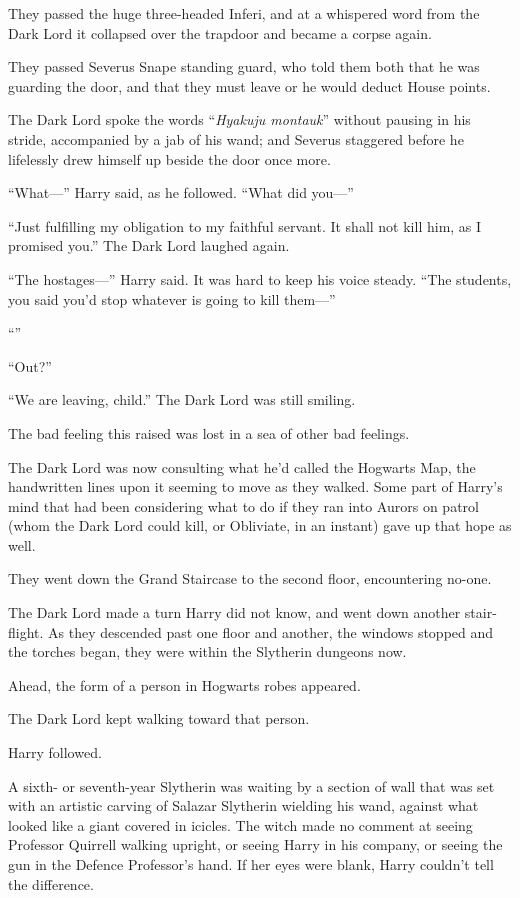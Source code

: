 They passed the huge three-headed Inferi, and at a whispered word from the Dark Lord it collapsed over the trapdoor and became a corpse again.

They passed Severus Snape standing guard, who told them both that he was guarding the door, and that they must leave or he would deduct House points.

The Dark Lord spoke the words “\emph{Hyakuju montauk}” without pausing in his stride, accompanied by a jab of his wand; and Severus staggered before he lifelessly drew himself up beside the door once more.

“What—” Harry said, as he followed. “What did you—”

“Just fulfilling my obligation to my faithful servant. It shall not kill him, as I promised you.” The Dark Lord laughed again.

“The hostages—” Harry said. It was hard to keep his voice steady. “The students, you said you’d stop whatever is going to kill them—”

“”

“Out?”

“We are leaving, child.” The Dark Lord was still smiling.

The bad feeling this raised was lost in a sea of other bad feelings.

The Dark Lord was now consulting what he’d called the Hogwarts Map, the handwritten lines upon it seeming to move as they walked. Some part of Harry’s mind that had been considering what to do if they ran into Aurors on patrol (whom the Dark Lord could kill, or Obliviate, in an instant) gave up that hope as well.

They went down the Grand Staircase to the second floor, encountering no-one.

The Dark Lord made a turn Harry did not know, and went down another stair-flight. As they descended past one floor and another, the windows stopped and the torches began, they were within the Slytherin dungeons now.

Ahead, the form of a person in Hogwarts robes appeared.

The Dark Lord kept walking toward that person.

Harry followed.

A sixth- or seventh-year Slytherin was waiting by a section of wall that was set with an artistic carving of Salazar Slytherin wielding his wand, against what looked like a giant covered in icicles. The witch made no comment at seeing Professor Quirrell walking upright, or seeing Harry in his company, or seeing the gun in the Defence Professor’s hand. If her eyes were blank, Harry couldn’t tell the difference.

